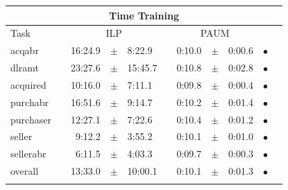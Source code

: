 \begin{table}[h!]
\centering 
\begin{tabular}
{lcrclcrcl@{\hspace{0.1cm}}cc}

\multicolumn{11}{c}{Time Training}\\
\hline
Task && \multicolumn{3}{c}{ILP}  && \multicolumn{3}{c}{PAUM} && \\
\hline
            acqabr &&    16:24.9 &  $\pm$  &      8:22.9 & &     0:10.0 &  $\pm$  &      0:00.6 & $\bullet$ \\
            dlramt &&    23:27.6 &  $\pm$  &     15:45.7 & &     0:10.8 &  $\pm$  &      0:02.8 & $\bullet$ \\
          acquired &&    10:16.0 &  $\pm$  &      7:11.1 & &     0:09.8 &  $\pm$  &      0:00.4 & $\bullet$ \\
          purchabr &&    16:51.6 &  $\pm$  &      9:14.7 & &     0:10.2 &  $\pm$  &      0:01.4 & $\bullet$ \\
         purchaser &&    12:27.1 &  $\pm$  &      7:22.6 & &     0:10.4 &  $\pm$  &      0:01.2 & $\bullet$ \\
            seller &&     9:12.2 &  $\pm$  &      3:55.2 & &     0:10.1 &  $\pm$  &      0:01.0 & $\bullet$ \\
         sellerabr &&     6:11.5 &  $\pm$  &      4:03.3 & &     0:09.7 &  $\pm$  &      0:00.3 & $\bullet$ \\
\hline
           overall &&    13:33.0 &  $\pm$  &     10:00.1 & &     0:10.1 &  $\pm$  &      0:01.3 & $\bullet$ \\
\hline
\\


\end{tabular}
\end{table}
